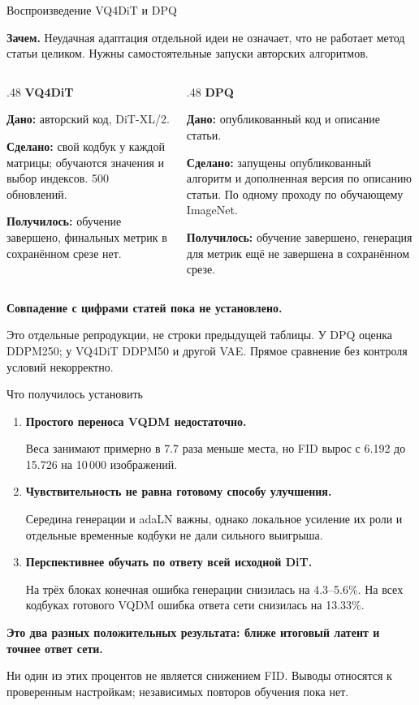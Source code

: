 \documentclass[aspectratio=1610,11pt]{beamer}
\renewcommand{\fact}[2]{\par\textcolor{Accent}{\textbf{#1.}} #2\par}
\newcommand{\finding}[1]{\par\vspace{.5mm}\textbf{#1}\par}
\newcommand{\detail}[1]{{\fontsize{10}{12}\selectfont #1\par}}
\newcommand{\tights}{\setlength{\itemsep}{1.5mm}\setlength{\parsep}{0pt}\setlength{\parskip}{0pt}}
\begin{document}
\begin{frame}[t]{Воспроизведение VQ4DiT и DPQ}
  \fact{Зачем}{Неудачная адаптация отдельной идеи не означает, что не работает
  метод статьи целиком. Нужны самостоятельные запуски авторских алгоритмов.}
  \begin{columns}[T,onlytextwidth]
    \begin{column}{.48\textwidth}
      \textbf{VQ4DiT}
      \par\textbf{Дано:} авторский код, DiT-XL/2.
      \par\textbf{Сделано:} свой кодбук у каждой матрицы;
      обучаются значения и выбор индексов. 500 обновлений.
      \par\textbf{Получилось:} обучение завершено, финальных метрик
      в сохранённом срезе нет.
    \end{column}
    \begin{column}{.48\textwidth}
      \textbf{DPQ}
      \par\textbf{Дано:} опубликованный код и описание статьи.
      \par\textbf{Сделано:} запущены опубликованный алгоритм и дополненная
      версия по описанию статьи. По одному проходу по обучающему ImageNet.
      \par\textbf{Получилось:} обучение завершено, генерация для метрик
      ещё не завершена в сохранённом срезе.
    \end{column}
  \end{columns}
  \finding{Совпадение с цифрами статей пока не установлено.}
  \detail{Это отдельные репродукции, не строки предыдущей таблицы. У DPQ оценка DDPM250;
  у VQ4DiT DDPM50 и другой VAE. Прямое сравнение без контроля условий некорректно.}
\end{frame}

\begin{frame}[t]{Что получилось установить}
  \begin{enumerate}\tights
    \item \textbf{Простого переноса VQDM недостаточно.}
      \par Веса занимают примерно в 7.7 раза меньше места,
      но FID вырос с 6.192 до 15.726 на 10\,000 изображений.
    \item \textbf{Чувствительность не равна готовому способу улучшения.}
      \par Середина генерации и adaLN важны, однако локальное усиление их роли
      и отдельные временные кодбуки не дали сильного выигрыша.
    \item \textbf{Перспективнее обучать по ответу всей исходной DiT.}
      \par На трёх блоках конечная ошибка генерации снизилась на 4.3--5.6\%.
      На всех кодбуках готового VQDM ошибка ответа сети снизилась на 13.33\%.
  \end{enumerate}
  \vspace{2mm}
  \finding{Это два разных положительных результата: ближе итоговый латент и точнее ответ сети.}
  \detail{Ни один из этих процентов не является снижением FID.
  Выводы относятся к проверенным настройкам; независимых повторов обучения пока нет.}
\end{frame}
\end{document}
